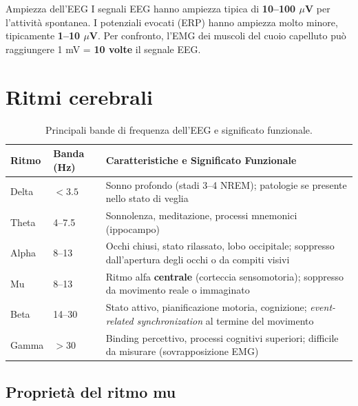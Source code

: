 \begin{approfondimento}{Ampiezza dell'EEG}
I segnali EEG hanno ampiezza tipica di \textbf{10--100 $\mu$V} per l'attività spontanea. I potenziali evocati (ERP) hanno ampiezza molto minore, tipicamente \textbf{1--10 $\mu$V}. Per confronto, l'EMG dei muscoli del cuoio capelluto può raggiungere 1 mV = \textbf{10 volte} il segnale EEG.
\end{approfondimento}

\section{Ritmi cerebrali}

\begin{table}[h!]
\centering
\begin{tabular}{llp{8cm}}
\toprule
\textbf{Ritmo} & \textbf{Banda (Hz)} & \textbf{Caratteristiche e Significato Funzionale} \\
\midrule
Delta & $< 3.5$ & Sonno profondo (stadi 3--4 NREM); patologie se presente nello stato di veglia \\
Theta & 4--7.5 & Sonnolenza, meditazione, processi mnemonici (ippocampo) \\
Alpha & 8--13 & Occhi chiusi, stato rilassato, lobo occipitale; soppresso dall'apertura degli occhi o da compiti visivi \\
Mu & 8--13 & Ritmo alfa \textbf{centrale} (corteccia sensomotoria); soppresso da movimento reale o immaginato \\
Beta & 14--30 & Stato attivo, pianificazione motoria, cognizione; \textit{event-related synchronization} al termine del movimento \\
Gamma & $> 30$ & Binding percettivo, processi cognitivi superiori; difficile da misurare (sovrapposizione EMG) \\
\bottomrule
\end{tabular}
\caption{Principali bande di frequenza dell'EEG e significato funzionale.}
\end{table}

\subsection{Proprietà del ritmo mu}

